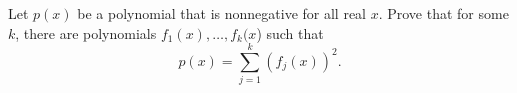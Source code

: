Let $p(x)$ be a polynomial that is nonnegative for all real $x$.  Prove that
for some $k$, there are polynomials $f_1(x),\dots,f_k(x$) such that
\[p(x) =  \sum_{j=1}^k (f_j(x))^2.\]
